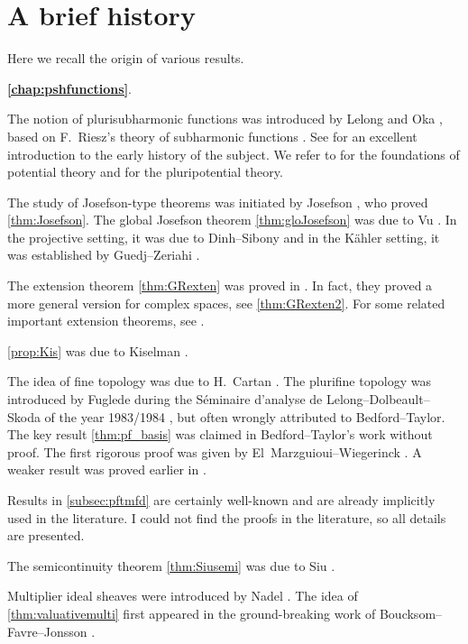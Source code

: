 \label{chap:history}

\section*{A brief history}

Here we recall the origin of various results.

\textbf{\cref{chap:pshfunctions}}.

The notion of plurisubharmonic functions was introduced by Lelong \cite{Lel45} and Oka \cite{Oka42}, based on F.~Riesz's theory of subharmonic functions \cite{Rie26}. See \cite{Bre72} for an excellent introduction to the early history of the subject. We refer to \cite{Bre65} for the foundations of potential theory and \cite{GZ17} for the pluripotential theory.

The study of Josefson-type theorems was initiated by Josefson \cite{Jos78}, who proved \cref{thm:Josefson}.
The global Josefson theorem \cref{thm:gloJosefson} was due to Vu \cite{Vu19}. In the projective setting, it was due to Dinh--Sibony \cite{DS06} and in the K\"ahler setting, it was established by Guedj--Zeriahi \cite{GZ05}.

The extension theorem \cref{thm:GRexten} was proved in \cite{GR56}. In fact, they proved a more general version for complex spaces, see \cref{thm:GRexten2}. For some related important extension theorems, see \cite{Shi72, Wan22, CGZ13}.

\cref{prop:Kis} was due to Kiselman \cite{Kis78}.

The idea of fine topology was due to H.~Cartan \cite{Car41}.
The plurifine topology was introduced by Fuglede during the Séminaire d'analyse de Lelong--Dolbeault--Skoda of the year 1983/1984 \cite{Lel86}, but often wrongly attributed to Bedford--Taylor. The key result \cref{thm:pf_basis} was claimed in Bedford--Taylor's work \cite[Theorem~2.3]{BT87} without proof. The first rigorous proof was given by El~Marzguioui--Wiegerinck \cite{EMW06}. A weaker result was proved earlier in \cite[Theorem~4.8.7]{Kl91}.

Results in \cref{subsec:pftmfd} are certainly well-known and are already implicitly used in the literature. I could not find the proofs in the literature, so all details are presented.

The semicontinuity theorem \cref{thm:Siusemi} was due to Siu \cite{Siu74}.

Multiplier ideal sheaves were introduced by Nadel \cite{Nad90}.
The idea of \cref{thm:valuativemulti} first appeared in the ground-breaking work of Boucksom--Favre--Jonsson \cite{BFJ08}.

